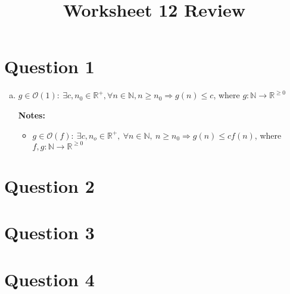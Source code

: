 \documentclass[12pt]{article}
\begin{document}
\title{Worksheet 12 Review}
\maketitle

\section*{Question 1}
\begin{enumerate}[a.]
    \item

    $g \in \mathcal{O}(1):\:\exists c,n_0 \in \mathbb{R}^{+}, \forall n \in
    \mathbb{N}, n \geq n_0 \Rightarrow g(n) \leq c$, where $g: \mathbb{N} \to \mathbb{R}^{\geq 0}$

    \bigskip

    \textbf{Notes:}

    \begin{itemize}
        \item

        $g \in \mathcal{O}(f):\:\exists c,n_o \in \mathbb{R}^{+},\:\forall n \in
        \mathbb{N},\:n \geq n_0 \Rightarrow g(n) \leq cf(n)$, where $f,g:\mathbb{N} \to \mathbb{R}^{\geq 0}$

    \end{itemize}

\end{enumerate}

\section*{Question 2}

\section*{Question 3}

\section*{Question 4}
\end{document}
